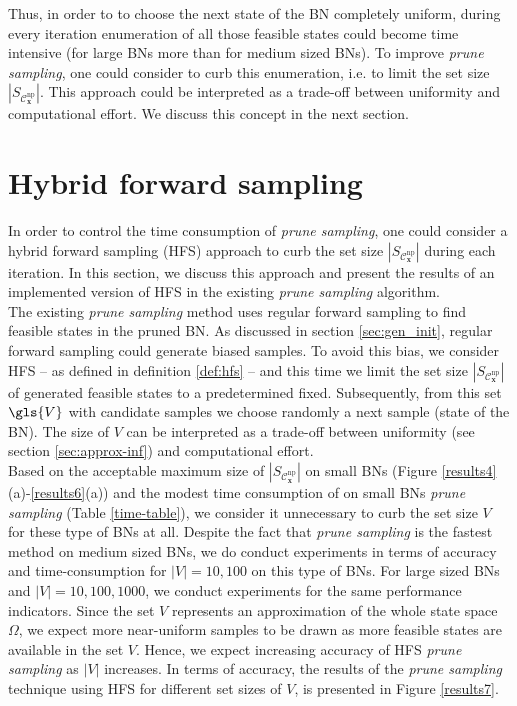 \documentclass[a4paper, twoside, 11pt]{report}
\newcommand{\bfx}{{\mathbf{x}}}
\newcommand{\C}{{\mathcal C}}
\theoremstyle{plain}
\theoremstyle{definition}
\theoremstyle{remark}
\newcommand{\ps}{\textit{prune sampling }}
\begin{document}
Thus, in order to to choose the next state of the BN completely uniform, during every iteration enumeration of all those feasible states could become time intensive (for large BNs more than for medium sized BNs). To improve \textit{prune sampling}, one could consider to curb this enumeration, i.e. to limit the set size $|S_{\C_\bfx^{\text{np}}}|$. This approach could be interpreted as a trade-off between uniformity and computational effort. We discuss this concept in the next section.

\section{Hybrid forward sampling}
In order to control the time consumption of \textit{prune sampling}, one could consider a {hybrid forward sampling} (HFS) approach to curb the set size $|S_{\C_\bfx^{\text{np}}}|$ during each iteration. In this section, we discuss this approach and present the results of an implemented version of HFS in the existing \ps algorithm. \\

The existing \ps method uses regular forward sampling to find feasible states in the pruned BN. As discussed in section \ref{sec:gen_init}, regular forward sampling could generate biased samples. To avoid this bias, we consider \gls{HFS} -- as defined in definition \ref{def:hfs} -- and this time we limit the set size $|S_{\C_\bfx^{\text{np}}}|$ of generated feasible states to a predetermined fixed. Subsequently, from this set $\gls{V}$ with candidate samples we choose randomly a next sample (state of the BN). The size of $V$ can be interpreted as a trade-off between uniformity (see section \ref{sec:approx-inf}) and computational effort. \\

Based on the acceptable maximum size of $|S_{\C_\bfx^{\text{np}}}|$ on small BNs (Figure \ref{results4}(a)-\ref{results6}(a)) and the modest time consumption of on small BNs \ps (Table \ref{time-table}), we consider it unnecessary to curb the set size $V$ for these type of BNs at all. Despite the fact that \ps is the fastest method on medium sized BNs, we do conduct experiments in terms of accuracy and time-consumption for $|V| = 10, 100$ on this type of BNs. For large sized BNs and $|V| = 10, 100, 1000$, we conduct experiments for the same performance indicators. Since the set $V$ represents an approximation of the whole state space $\Omega$, we expect more near-uniform samples to be drawn as more feasible states are available in the set $V$. Hence, we expect increasing accuracy of HFS \ps as $|V|$ increases. In terms of accuracy, the results of the \ps technique using HFS for different set sizes of $V$, is presented in Figure \ref{results7}.\\
\end{document}
